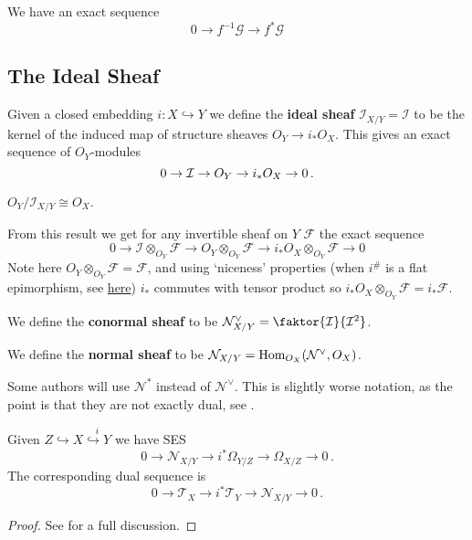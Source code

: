 \documentclass{article}
\begin{document}
\begin{prop}
We have an exact sequence
\[
0 \to f^{-1} \mathcal{G} \to f^\ast \mathcal{G}
\]
\end{prop}



\subsection{The Ideal Sheaf}

\begin{definition}
	Given a closed embedding $i :X\hookrightarrow Y$ we define the \textbf{ideal sheaf} $\mathcal{I}_{X/Y} = \mathcal{I}$ to be the kernel of the induced map of structure sheaves $O_Y \to i_\ast O_X$. This gives an exact sequence of $O_Y$-modules 
	\[
	0 \to \mathcal{I} \to O_Y \to i_\ast O_X \to 0\, .
	\]
\end{definition}


\begin{lemma}
	$O_Y/\mathcal{I}_{X/Y} \cong O_X$. 
\end{lemma}
From this result we get for any invertible sheaf on $Y$ $\mathcal{F}$ the exact sequence 
\[
0 \to \mathcal{I} \otimes_{O_Y} \mathcal{F} \to O_Y \otimes_{O_Y} \mathcal{F} \to i_\ast O_X \otimes_{O_Y} \mathcal{F} \to 0  
\]
Note here $O_Y \otimes_{O_Y} \mathcal{F} = \mathcal{F}$, and using `niceness' properties (when $i^\#$ is a flat epimorphism, see \href{https://mathoverflow.net/questions/49134/when-does-the-direct-image-functor-commute-with-tensor-products}{here}) $i_\ast$ commutes with tensor product so $i_\ast O_X \otimes_{O_Y} \mathcal{F} = i_\ast \mathcal{F}$. 

\begin{definition}
	We define the \textbf{conormal sheaf} to be $\mathcal{N}^\vee_{X/Y} = \faktor{\mathcal{I}}{\mathcal{I}^2}$.
\end{definition}
\begin{definition}
	We define the \textbf{normal sheaf} to be $\mathcal{N}_{X/Y} = \operatorname{Hom}_{O_X} (\mathcal{N}^\vee,O_X)$. 
\end{definition}
\begin{remark}
	Some authors will use $\mathcal{N}^\ast$ instead of $\mathcal{N}^\vee$. This is slightly worse notation, as the point is that they are not exactly dual, see \cite{Vakil2010}.
\end{remark}

\begin{prop}
	Given $Z \hookrightarrow X \overset{i}{\hookrightarrow Y}$ we have SES
	\[
	0 \to \mathcal{N}_{X/Y} \to i^\ast \Omega_{Y/Z} \to \Omega_{X/Z} \to 0 \, .
	\]
	The corresponding dual sequence is 
	\[
	0 \to \mathcal{T}_X \to i^\ast \mathcal{T}_Y \to \mathcal{N}_{X/Y} \to 0 \, .
	\]
\end{prop}
\begin{proof}
	See \cite{Vakil2010} for a full discussion. 
\end{proof}
\end{document}
